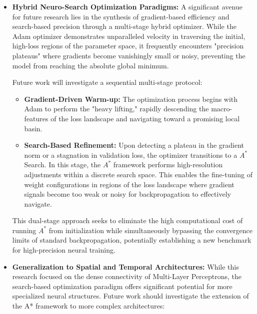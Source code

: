 \begin{itemize}
\item \textbf{Hybrid Neuro-Search Optimization Paradigms:} 
A significant avenue for future research lies in the synthesis of gradient-based efficiency and search-based precision through a multi-stage hybrid optimizer. While the Adam optimizer demonstrates unparalleled velocity in traversing the initial, high-loss regions of the parameter space, it frequently encounters "precision plateaus" where gradients become vanishingly small or noisy, preventing the model from reaching the absolute global minimum. 

Future work will investigate a sequential multi-stage protocol:
\begin{itemize}
    \item \textbf{Gradient-Driven Warm-up:} The optimization process begins with Adam to perform the "heavy lifting," rapidly descending the macro-features of the loss landscape and navigating toward a promising local basin.
    \item \textbf{Search-Based Refinement:} Upon detecting a plateau in the gradient norm or a stagnation in validation loss, the optimizer transitions to a $A^*$ Search. In this stage, the $A^*$ framework performs high-resolution adjustments within a discrete search space. This enables the fine-tuning of weight configurations in regions of the loss landscape where gradient signals become too weak or noisy for backpropagation to effectively navigate.
\end{itemize}



This dual-stage approach seeks to eliminate the high computational cost of running $A^*$ from initialization while simultaneously bypassing the convergence limits of standard backpropagation, potentially establishing a new benchmark for high-precision neural training.        
\item \textbf{Generalization to Spatial and Temporal Architectures:} 
While this research focused on the dense connectivity of Multi-Layer Perceptrons, the search-based optimization paradigm offers significant potential for more specialized neural structures. Future work should investigate the extension of the A* framework to more complex architectures:


\end{itemize}
